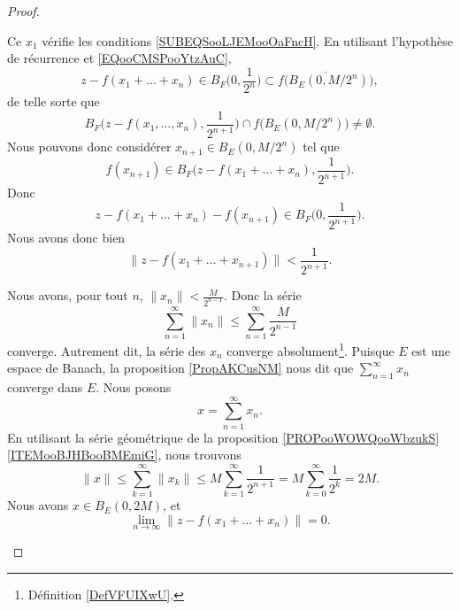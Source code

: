 \begin{proof}
\begin{subproof}
\begin{subproof}
			Ce \( x_1\) vérifie les conditions \eqref{SUBEQSooLJEMooOaFncH}.
			\spitem[La récurrence]
			En utilisant l'hypothèse de récurrence et \eqref{EQooCMSPooYtzAuC},
			\begin{equation}
				z-f(x_1+\ldots +x_n)\in B_F\big( 0,\frac{1}{ 2^n } \big)\subset\overline{ f\big( B_E(0,M/2^n) \big) },
			\end{equation}
			de telle sorte que
			\begin{equation}
				B_F\big( z-f(x_1,\ldots, x_n),\frac{1}{ 2^{n+1} } \big)\cap f\big( B_E(0,M/2^n) \big)\neq \emptyset.
			\end{equation}
			Nous pouvons donc considérer \( x_{n+1}\in B_E(0,M/2^n)\) tel que
			\begin{equation}
				f(x_{n+1})\in B_F\big( z-f(x_1+\ldots +x_n),\frac{1}{ 2^{n+1} } \big).
			\end{equation}
			Donc
			\begin{equation}
				z-f(x_1+\ldots +x_n)-f(x_{n+1})\in B_F\big( 0,\frac{1}{ 2^{n+1} } \big).
			\end{equation}
			Nous avons donc bien
			\begin{equation}
				\| z-f(x_1+\ldots +x_{n+1}) \|<\frac{1}{ 2^{n+1} }.
			\end{equation}
		\end{subproof}
		\spitem[Convergence]
		Nous avons, pour tout \( n\), \( \| x_n \|<\frac{ M }{ 2^{n-1} }\). Donc la série
		\begin{equation}
			\sum_{n=1}^{\infty}\| x_n \|\leq \sum_{n=1}^{\infty}\frac{ M }{ 2^{n-1} }
		\end{equation}
		converge. Autrement dit, la série des \( x_n\) converge absolument\footnote{Définition \ref{DefVFUIXwU}.}. Puisque \( E\) est une espace de Banach, la proposition \ref{PropAKCusNM} nous dit que \( \sum_{n=1}^{\infty}x_n\) converge dans \( E\). Nous posons
		\begin{equation}
			x=\sum_{n=1}^{\infty}x_n.
		\end{equation}
		En utilisant la série géométrique de la proposition \ref{PROPooWOWQooWbzukS}\ref{ITEMooBJHBooBMEmiG}, nous trouvons
		\begin{equation}
			\| x \|\leq \sum_{k=1}^{\infty}\| x_k \|\leq M\sum_{k=1}^{\infty}\frac{1}{ 2^{n+1} }=M\sum_{k=0}^{\infty}\frac{1}{ 2^k }=2M.
		\end{equation}
		Nous avons \( x\in B_E(0,2M)\), et
		\begin{equation}
			\lim_{n\to \infty} \| z-f(x_1+\ldots +x_n) \|=0.
		\end{equation}

\end{subproof}
\end{proof}
